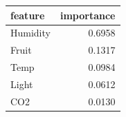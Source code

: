 \begin{tabular}{lr}
\toprule
feature & importance \\
\midrule
Humidity & 0.6958 \\
Fruit & 0.1317 \\
Temp & 0.0984 \\
Light & 0.0612 \\
CO2 & 0.0130 \\
\bottomrule
\end{tabular}
